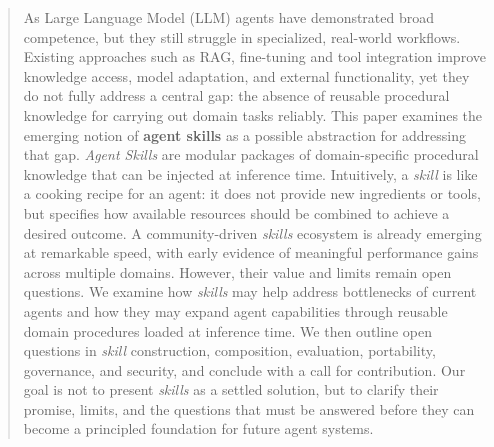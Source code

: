 \documentclass[sigconf,nonacm]{acmart}
\begin{document}
\begin{abstract}
As Large Language Model (LLM) agents  have demonstrated broad competence, but they still struggle in specialized, real-world workflows.
Existing approaches such as RAG, fine-tuning and tool integration improve knowledge access, model adaptation, and external functionality, yet they do not fully address a central gap: the absence of reusable procedural knowledge for carrying out domain tasks reliably.
This paper examines the emerging notion of \textbf{agent skills} as a possible abstraction for addressing that gap.
\emph{Agent Skills} are modular packages of domain-specific procedural knowledge that can be injected  at inference time.
Intuitively, a \emph{skill} is like a cooking recipe for an agent: it does not provide new ingredients or tools, but specifies how available resources should be combined to achieve a desired outcome.
A community-driven \emph{skills} ecosystem is already emerging at remarkable speed, with early evidence  of meaningful performance gains across multiple domains. However, their value and limits remain open questions. 
We examine how \emph{skills} may help address  bottlenecks of current agents and how they may expand agent capabilities through reusable domain procedures loaded at inference time.
We then outline open questions in  \emph{skill} construction, composition, evaluation, portability, governance, and security, and conclude with a call for contribution. 
Our goal is not to present \emph{skills} as a settled solution, but to clarify their promise, limits, and the questions that must be answered before they can become a principled foundation for future agent systems.

\end{abstract}


\end{document}
